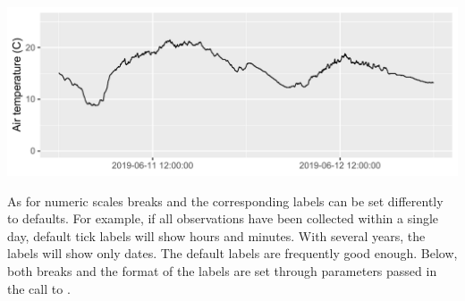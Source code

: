 \documentclass[krantz2]{krantz}\usepackage{knitr}
\begin{document}
\begin{knitrout}\footnotesize
{}\color{fgcolor}\begin{kframe}
\begin{alltt}
\hlstd{(} 
        \hlstd{=} \hlstd{(} \hlstd{=}   \hlstd{=} \hlstd{),}
                       \hlopt{+}
  \hlstd{(} \hlstd{=} \hlstd{)} \hlopt{+}
  \hlstd{(} \hlstd{=} \hlstd{,}
                    \hlstd{=} \hlstd{(}\hlstd{,}  \hlstd{=} \hlstd{)} \hlopt{+} \hlstd{(}\hlopt{:}\hlstd{),}
                    \hlstd{=} \hlstd{(}\hlstd{,}  \hlstd{=} \hlstd{)} \hlopt{+} \hlstd{(}\hlstd{(}\hlstd{,} \hlstd{)))} \hlopt{+}
  \hlstd{(} \hlstd{=} \hlstd{)} \hlopt{+}
  \hlstd{(} \hlstd{=} \hlstd{)}
\end{alltt}
\end{kframe}

{\centering \includegraphics[width=.9\textwidth]{figure/pos-scale-datetime-01-1} 

}


\end{knitrout}

As for numeric scales breaks and the corresponding labels can be set differently to defaults. For example, if all observations have been collected within a single day, default tick labels will show hours and minutes. With several years, the labels will show only dates. The default labels are frequently good enough. Below, both breaks and the format of the labels are set through parameters passed in the call to .
\end{document}
